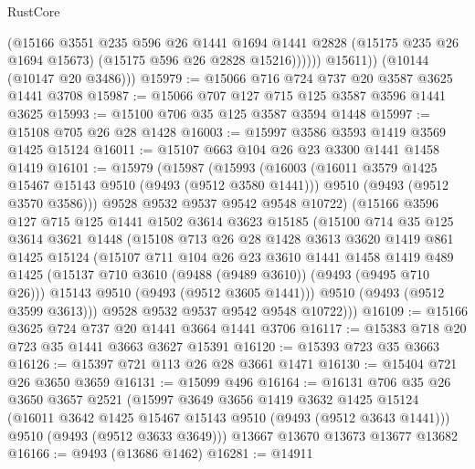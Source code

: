 \begin{lexlean}{RustCore}
\begin{coremodule}
                  (@15166
                    @3551
                    @235
                    @596
                    @26
                    @1441
                    @1694
                    @1441
                    @2828
                    (@15175 @235 @26 @1694 @15673)
                    (@15175 @596 @26 @2828 @15216))))))
          @15611))
      (@10144 (@10147 @20 @3486)))
@15979 := @15066 @716 @724 @737 @20 @3587 @3625 @1441 @3708
@15987 := @15066 @707 @127 @715 @125 @3587 @3596 @1441 @3625
@15993 := @15100 @706 @35 @125 @3587 @3594 @1448
@15997 := @15108 @705 @26 @28 @1428
@16003 := @15997 @3586 @3593 @1419 @3569 @1425 @15124
@16011 := @15107 @663 @104 @26 @23 @3300 @1441 @1458 @1419
@16101 := @15979
    (@15987
      (@15993
        (@16003
          (@16011 @3579 @1425 @15467 @15143 @9510 (@9493 (@9512 @3580 @1441)))
          @9510
          (@9493 (@9512 @3570 @3586)))
        @9528
        @9532
        @9537
        @9542
        @9548
        @10722)
      (@15166
        @3596
        @127
        @715
        @125
        @1441
        @1502
        @3614
        @3623
        @15185
        (@15100
          @714
          @35
          @125
          @3614
          @3621
          @1448
          (@15108
            @713
            @26
            @28
            @1428
            @3613
            @3620
            @1419
            @861
            @1425
            @15124
            (@15107
              @711
              @104
              @26
              @23
              @3610
              @1441
              @1458
              @1419
              @489
              @1425
              (@15137 @710 @3610 (@9488 (@9489 @3610)) (@9493 (@9495 @710 @26)))
              @15143
              @9510
              (@9493 (@9512 @3605 @1441)))
            @9510
            (@9493 (@9512 @3599 @3613)))
          @9528
          @9532
          @9537
          @9542
          @9548
          @10722)))
@16109 := @15166 @3625 @724 @737 @20 @1441 @3664 @1441 @3706
@16117 := @15383 @718 @20 @723 @35 @1441 @3663 @3627 @15391
@16120 := @15393 @723 @35 @3663
@16126 := @15397 @721 @113 @26 @28 @3661 @1471
@16130 := @15404 @721 @26 @3650 @3659
@16131 := @15099 @496
@16164 := @16131
    @706
    @35
    @26
    @3650
    @3657
    @2521
    (@15997
      @3649
      @3656
      @1419
      @3632
      @1425
      @15124
      (@16011 @3642 @1425 @15467 @15143 @9510 (@9493 (@9512 @3643 @1441)))
      @9510
      (@9493 (@9512 @3633 @3649)))
    @13667
    @13670
    @13673
    @13677
    @13682
@16166 := @9493 (@13686 @1462)
@16281 := @14911

\end{coremodule}
\end{lexlean}
